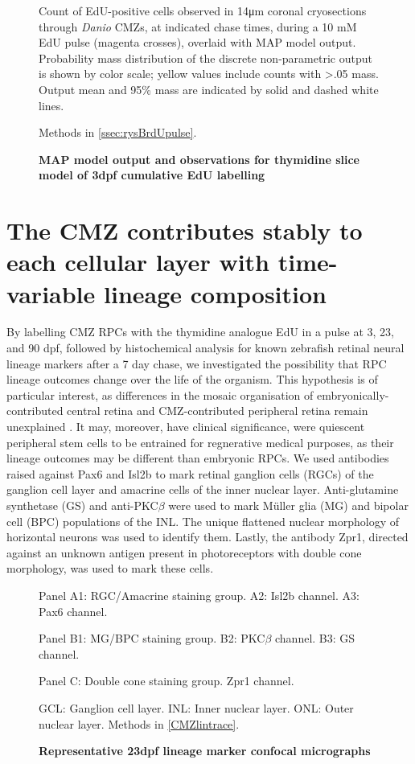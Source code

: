 \begin{figure}[!h]
    \caption{{\bf MAP model output and observations for thymidine slice model of 3dpf cumulative EdU labelling}}
    Count of EdU-positive cells observed in 14\si{\micro\metre} coronal cryosections through \textit{Danio} CMZs, at indicated chase times, during a 10 mM EdU pulse (magenta crosses), overlaid with MAP model output. Probability mass distribution of the discrete non-parametric output is shown by color scale; yellow values include counts with >.05 mass. Output mean and 95\% mass are indicated by solid and dashed white lines.

    Methods in \autoref{ssec:rysBrdUpulse}.
    \label{a25marginals}
\end{figure}

\section{The CMZ contributes stably to each cellular layer with time-variable lineage composition}

By labelling CMZ RPCs with the thymidine analogue EdU in a pulse at 3, 23, and 90 dpf, followed by histochemical analysis for known zebrafish retinal neural lineage markers after a 7 day chase, we investigated the possibility that RPC lineage outcomes change over the life of the organism. This hypothesis is of particular interest, as differences in the mosaic organisation of embryonically-contributed central retina and CMZ-contributed peripheral retina remain unexplained \cite{Allison2010}. It may, moreover, have clinical significance, were quiescent peripheral stem cells to be entrained for regnerative medical purposes, as their lineage outcomes may be different than embryonic RPCs.  We used antibodies raised against Pax6 and Isl2b to mark retinal ganglion cells (RGCs) of the ganglion cell layer and amacrine cells of the inner nuclear layer. Anti-glutamine synthetase (GS) and anti-PKC$\beta$ were used to mark M\"{u}ller glia (MG) and bipolar cell (BPC) populations of the INL. The unique flattened nuclear morphology of horizontal neurons was used to identify them. Lastly, the antibody Zpr1, directed against an unknown antigen present in photoreceptors with double cone morphology, was used to mark these cells.

\begin{figure}[!h]
    \caption{{\bf Representative 23dpf lineage marker confocal micrographs}}
    Panel A1: RGC/Amacrine staining group. A2: Isl2b channel. A3: Pax6 channel.

    Panel B1: MG/BPC staining group. B2: PKC$\beta$ channel. B3: GS channel.

    Panel C: Double cone staining group. Zpr1 channel.

    GCL: Ganglion cell layer. INL: Inner nuclear layer. ONL: Outer nuclear layer.
    Methods in \autoref{CMZlintrace}.
    \label{staininggroups}
\end{figure}

